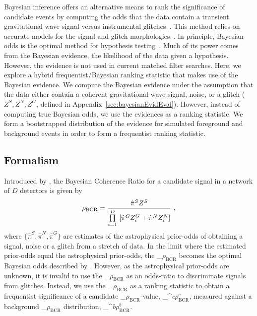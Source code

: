 \documentclass[
 nofootinbib,
 amsmath,amssymb,
 aps,
 twocolumn,
 superscriptaddress
]{revtex4-2}
\newcommand{\mathcmd}[1]{{\sc \relax\ifmmode#1\else $#1$\fi}\xspace}
\newcommand{\bcr}{\mathcmd{\rho_\text{BCR}}}
\newcommand{\bgrdbcr}{\mathcmd{\rho_\text{BCR}^\textit{b}}}
\newcommand{\candbcr}{\mathcmd{\rho_\text{BCR}^\textit{c}}}
\begin{document}
Bayesian inference offers an alternative means to rank the significance of candidate events by computing the odds that the data contain a transient gravitational-wave signal versus instrumental glitches~\cite{BCR1}. This method relies on accurate models for the signal and glitch morphologies~\cite{BCR1}. In principle, Bayesian odds is the optimal method for hypothesis testing~\cite{BCR2}. Much of its power comes from the Bayesian evidence, the likelihood of the data given a hypothesis. However, the evidence is not used in current matched filter searches. Here, we explore a hybrid frequentist/Bayesian ranking statistic that makes use of the Bayesian evidence. We compute the Bayesian evidence under the assumption that the data either contain a coherent gravitational-wave signal, noise, or a glitch ($Z^S, Z^N, Z^G$, defined in Appendix~\ref{sec:bayesianEvidEval}). However, instead of computing true Bayesian odds, we use the evidences as a ranking statistic. We form a bootstrapped distribution of the evidence for simulated foreground and background events in order to form a frequentist ranking statistic.

\subsection{Formalism}

Introduced by \citet{BCR1}, the Bayesian Coherence Ratio for a candidate signal in a network of $D$ detectors is given by
\begin{equation}
\label{eq:bcr}
\bcr = \frac{\hat{\pi}^S Z^S}{\prod\limits^D_{i=1} \ [\hat{\pi}^G Z^G_i + \hat{\pi}^N Z^N_i]}\  ,
\end{equation}
where $\{\hat{\pi}^S, \hat{\pi}^N, \hat{\pi}^G\}$ are estimates of the astrophysical prior-odds of obtaining a signal, noise or a glitch from a stretch of data. In the limit where the estimated prior-odds equal the astrophysical prior-odds, the \bcr becomes the optimal Bayesian odds described by \citet{BCR2}.  However, as the astrophysical prior-odds are unknown, it is invalid to use the \bcr as an odds-ratio to discriminate signals from glitches. Instead, we use the \bcr as a ranking statistic to obtain a frequentist significance of a candidate \bcr-value, \candbcr, measured against a background \bcr distribution, \bgrdbcr. 
\end{document}
